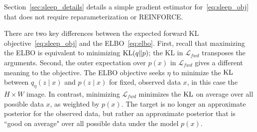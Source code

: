 Section~\ref{sec:sleep_details} details a simple gradient estimator for~\eqref{eq:sleep_obj} that does not require reparameterization or REINFORCE.

There are two key differences between the expected forward KL objective~\eqref{eq:sleep_obj}
and the ELBO~\eqref{eq:elbo}.
First, recall that maximizing the ELBO is equivalent to minimizing
$\textrm{KL}(q\|p)$; the KL in $\mathcal{L}_{fwd}$ transposes the arguments.
Second, the outer expectation over $p(x)$ in $\mathcal{L}_{fwd}$ gives a different meaning to the objective.
The ELBO objective seeks $\eta$ to minimize the $\textrm{KL}$ between $q_\eta(z \mid x)$ and $p(z \mid x)$
for fixed, observed data $x$,
in this case the $H\times W$ image.
In contrast, minimizing $\mathcal{L}_{fwd}$ minimizes the $\textrm{KL}$
on average over all possible data $x$,
as weighted by $p(x)$.
The target is no longer an approximate posterior for the observed data, but rather
an approximate posterior that is ``good on average" over all possible data under the model $p(x)$.

%
%
%
%

